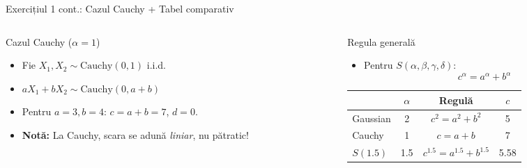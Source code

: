 \documentclass[9pt, aspectratio=169, t]{beamer}
\begin{document}
\begin{frame}{Exercițiul 1 cont.: Cazul Cauchy + Tabel comparativ}
    \begin{cminipage}{0.95\textwidth}
\begin{columns}[T]
\begin{column}{0.48\textwidth}
\begin{block}{Cazul Cauchy ($\alpha = 1$)}
\begin{itemize}\setlength{\itemsep}{0pt}
    \item Fie $X_1, X_2 \sim \text{Cauchy}(0,1)$ i.i.d.
    \item $aX_1 + bX_2 \sim \text{Cauchy}(0, a+b)$
    \item Pentru $a=3, b=4$: $c = a + b = 7$, $d = 0$.
    \item \textbf{Notă:} La Cauchy, scara se adună \textit{liniar}, nu pătratic!
\end{itemize}
\end{block}
\end{column}
\begin{column}{0.48\textwidth}
\begin{block}{Regula generală}
\begin{itemize}\setlength{\itemsep}{0pt}
    \item Pentru $S(\alpha, \beta, \gamma, \delta)$:
$$c^\alpha = a^\alpha + b^\alpha$$
\end{itemize}

\vspace{0.2cm}
\renewcommand{\arraystretch}{1.3}
\begin{tabular}{lccc}
\toprule
& $\alpha$ & Regulă & $c$ \\
\midrule
Gaussian & 2 & $c^2 = a^2+b^2$ & 5 \\
Cauchy & 1 & $c = a+b$ & 7 \\
$S(1.5)$ & 1.5 & $c^{1.5} = a^{1.5}+b^{1.5}$ & 5.58 \\
\bottomrule
\end{tabular}
\end{block}
\end{column}
\end{columns}
    \end{cminipage}
\end{frame}
\end{document}
